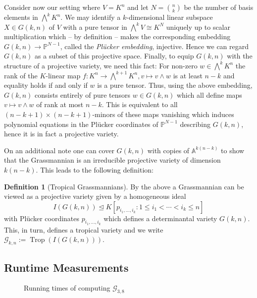 \documentclass[
  paper=a4,
  titlepage,
  bibliography=totoc,
  listof=totoc,
  pagesize=pdftex
]{scrartcl}
\numberwithin{figure}{section}
\numberwithin{equation}{section}
\numberwithin{table}{section}
\newcommand*\setA{\mathds{A}}
\newcommand*\setP{\mathds{P}}
\let\idealof\trianglelefteq
\DeclareMathOperator{\Trop}{Trop}
\theoremstyle{definition}
\newtheorem{definition}{Definition}
\numberwithin{definition}{section}
\begin{document}
Consider now our setting where $V=K^n$ and let $N = \binom nk$ be the number of basis
elements in $\bigwedge^kK^n$. We may identify a $k$-dimensional linear subspace $X \in
G(k,n)$ of $V$ with a pure tensor in $\bigwedge^kV \cong K^N$ uniquely up to scalar
multiplication which -- by definition -- makes the corresponding embedding $G(k,n) \to
\setP^{N-1}$, called the \emph{Plücker embedding}, injective. Hence we can regard $G(k,n)$
as a subset of this projective space. Finally, to equip $G(k,n)$ with the structure of a
projective variety, we need this fact: For non-zero $w\in \bigwedge^kK^n$ the rank of the
$K$-linear map $f:K^n \to \bigwedge^{k+1}K^n, v \mapsto v \wedge w$ is at least $n-k$ and
equality holds if and only if $w$ is a pure tensor. Thus, using the above embedding,
$G(k,n)$ consists entirely of pure tensors $w\in G(k,n)$ which all define maps $v\mapsto
v\wedge w$ of rank at most $n-k$. This is equivalent to all $(n-k+1) \times
(n-k+1)$-minors of these maps vanishing which induces polynomial equations in the Plücker
coordinates of $\setP^{N-1}$ describing $G(k,n)$, hence it is in fact a projective
variety.

On an additional note one can cover $G(k,n)$ with copies of $\setA^{k(n-k)}$ to show that
the Grassmannian is an irreducible projective variety of dimension $k(n-k)$. This leads to
the following definition:

\begin{definition}[Tropical Grassmannians]
  By the above a Grassmannian can be viewed as a projective variety given by a homogeneous
  ideal
  \[
    I(G(k,n)) \idealof K[ p_{i_1, \dots, i_k} : 1\leq i_1 < \cdots < i_k \leq n ]
  \]
  with Plücker coordinates $p_{i_1,\dots,i_k}$ which defines a determinantal variety $G(k,
  n)$. This, in turn, defines a tropical variety and we write $\mathcal G_{k,n} :=
  \Trop(I(G(k,n)))$.
\end{definition}

\subsection{Runtime Measurements}

\begin{figure}[htbp]
  \begin{center}
    
  \end{center}
  \caption{Running times of computing $\mathcal{G}_{3,8}$}
  \label{fig:g38scaling}
\end{figure}
\end{document}
